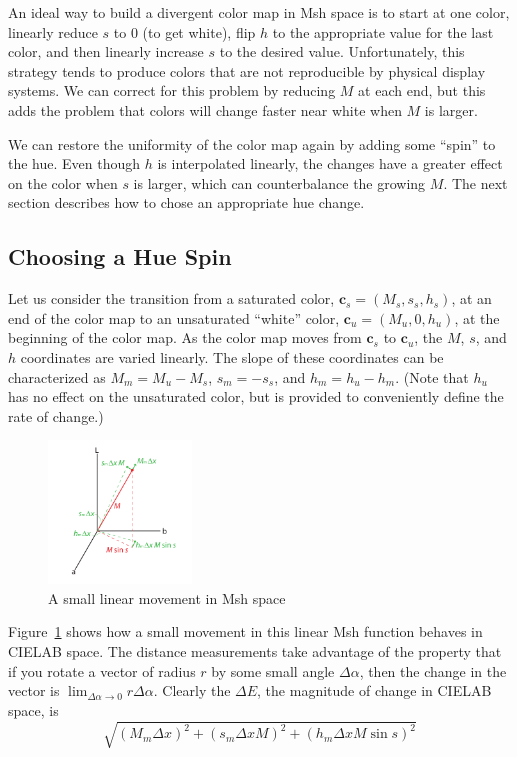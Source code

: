 \documentclass[twocolumn]{article}
\newcommand{\Lab}{CIELAB\xspace}
\newcommand{\Msh}{Msh\xspace}
\newcommand{\DeltaE}{\ensuremath{\Delta{}E}\xspace}
\newcommand*{\cvec}[1]{\mathbf{#1}}
\begin{document}
An ideal way to build a divergent color map in \Msh space is to start at
one color, linearly reduce $s$ to 0 (to get white), flip $h$ to the
appropriate value for the last color, and then linearly increase $s$ to the
desired value.  Unfortunately, this strategy tends to produce colors that
are not reproducible by physical display systems.  We can correct for this
problem by reducing $M$ at each end, but this adds the problem that colors
will change faster near white when $M$ is larger.

We can restore the uniformity of the color map again by adding some
``spin'' to the hue.  Even though $h$ is interpolated linearly, the changes
have a greater effect on the color when $s$ is larger, which can
counterbalance the growing $M$.  The next section describes how to chose an
appropriate hue change.

\subsection{Choosing a Hue Spin}
\label{sec:ChoosingAHueSpin}

Let us consider the transition from a saturated color, $\cvec{c}_s=(M_s,
s_s, h_s)$, at an end of the color map to an unsaturated ``white'' color,
$\cvec{c}_u=(M_u, 0, h_u)$, at the beginning of the color map.  As the
color map moves from $\cvec{c}_s$ to $\cvec{c}_u$, the $M$, $s$, and $h$
coordinates are varied linearly.  The slope of these coordinates can be
characterized as $M_m = M_u - M_s$, $s_m = -s_s$, and $h_m = h_u - h_m$.
(Note that $h_u$ has no effect on the unsaturated color, but is provided to
conveniently define the rate of change.)

\begin{figure}
  \centering
  \includegraphics[height=1.5in]{images/MshDeltaMovements}
  \caption{A small linear movement in \Msh space}
  \label{sec:LinearMshMovement}
\end{figure}

Figure~\ref{sec:LinearMshMovement} shows how a small movement in this
linear \Msh function behaves in \Lab space.  The distance measurements take
advantage of the property that if you rotate a vector of radius $r$ by some
small angle $\Delta\alpha$, then the change in the vector is
$\lim_{\Delta\alpha \rightarrow 0}r \Delta\alpha$.  Clearly the \DeltaE,
the magnitude of change in \Lab space, is
\begin{equation}
  \sqrt{(M_m \Delta x)^2 + (s_m \Delta x M)^2 + (h_m \Delta x M \sin s)^2}
  \label{eq:DeltaEforLinearMshMovement}
\end{equation}
\end{document}

